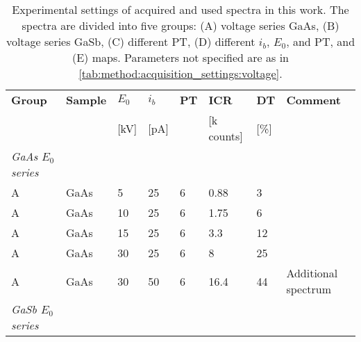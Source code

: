 \begin{table}[phtb]
    \begin{center}
        \caption{
            Experimental settings of acquired and used spectra in this work.
            The spectra are divided into five groups: (A) voltage series GaAs, (B) voltage series GaSb, (C) different PT, (D) different $i_b$, $E_0$, and PT, and (E) maps.
            Parameters not specified are as in \cref{tab:method:acquisition_settings:voltage}.
        }
        \renewcommand*{\arraystretch}{1.2}
        \label{tab:method:acquisition_settings:all_spectra}
        \begin{tabular}{lllllllp{3.5cm}}
            \hline
            \textbf{Group}                     & \textbf{Sample} & \textbf{$E_0$} & \textbf{$i_b$} & \textbf{PT} & \textbf{ICR} & \textbf{DT} & \textbf{Comment}    \\
                                               &                 & [kV]           & [pA]           &             & [k counts]   & [\%]        &                     \\
            \hline
            \emph{GaAs $E_0$ series}           &                 &                &                &             &              &             &                     \\
            A                                  & GaAs            & 5              & 25             & 6           & 0.88         & 3           &                     \\
            A                                  & GaAs            & 10             & 25             & 6           & 1.75         & 6           &                     \\
            A                                  & GaAs            & 15             & 25             & 6           & 3.3          & 12          &                     \\
            A                                  & GaAs            & 30             & 25             & 6           & 8            & 25          &                     \\
            A                                  & GaAs            & 30             & 50             & 6           & 16.4         & 44          & Additional spectrum \\
            \hline
            \emph{GaSb $E_0$ series  }         &                 &                &                &             &              &             &                     \\

\end{tabular}
\end{center}
\end{table}
